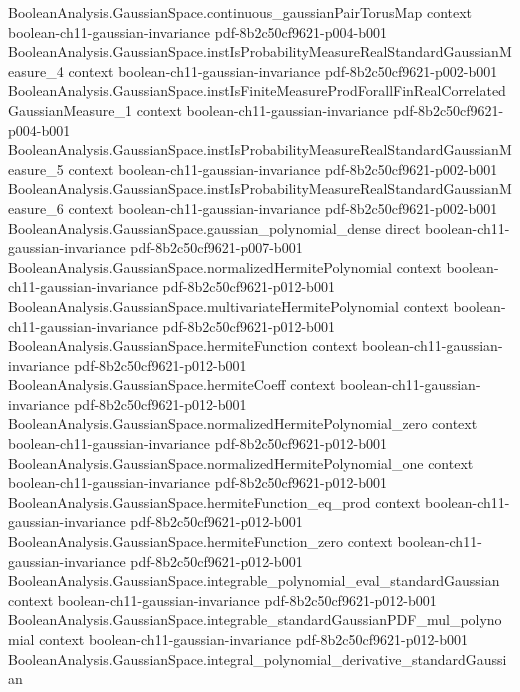 \begin{lemma}
  {BooleanAnalysis.GaussianSpace.continuous_gaussianPairTorusMap}
  {context}
  {boolean-ch11-gaussian-invariance}
  {pdf-8b2c50cf9621-p004-b001}
\proofstep
  {BooleanAnalysis.GaussianSpace.instIsProbabilityMeasureRealStandardGaussianMeasure_4}
  {context}
  {boolean-ch11-gaussian-invariance}
  {pdf-8b2c50cf9621-p002-b001}
\proofstep
  {BooleanAnalysis.GaussianSpace.instIsFiniteMeasureProdForallFinRealCorrelatedGaussianMeasure_1}
  {context}
  {boolean-ch11-gaussian-invariance}
  {pdf-8b2c50cf9621-p004-b001}
\proofstep
  {BooleanAnalysis.GaussianSpace.instIsProbabilityMeasureRealStandardGaussianMeasure_5}
  {context}
  {boolean-ch11-gaussian-invariance}
  {pdf-8b2c50cf9621-p002-b001}
\proofstep
  {BooleanAnalysis.GaussianSpace.instIsProbabilityMeasureRealStandardGaussianMeasure_6}
  {context}
  {boolean-ch11-gaussian-invariance}
  {pdf-8b2c50cf9621-p002-b001}
\proofstep
  {BooleanAnalysis.GaussianSpace.gaussian_polynomial_dense}
  {direct}
  {boolean-ch11-gaussian-invariance}
  {pdf-8b2c50cf9621-p007-b001}
\proofstep
  {BooleanAnalysis.GaussianSpace.normalizedHermitePolynomial}
  {context}
  {boolean-ch11-gaussian-invariance}
  {pdf-8b2c50cf9621-p012-b001}
\proofstep
  {BooleanAnalysis.GaussianSpace.multivariateHermitePolynomial}
  {context}
  {boolean-ch11-gaussian-invariance}
  {pdf-8b2c50cf9621-p012-b001}
\proofstep
  {BooleanAnalysis.GaussianSpace.hermiteFunction}
  {context}
  {boolean-ch11-gaussian-invariance}
  {pdf-8b2c50cf9621-p012-b001}
\proofstep
  {BooleanAnalysis.GaussianSpace.hermiteCoeff}
  {context}
  {boolean-ch11-gaussian-invariance}
  {pdf-8b2c50cf9621-p012-b001}
\proofstep
  {BooleanAnalysis.GaussianSpace.normalizedHermitePolynomial_zero}
  {context}
  {boolean-ch11-gaussian-invariance}
  {pdf-8b2c50cf9621-p012-b001}
\proofstep
  {BooleanAnalysis.GaussianSpace.normalizedHermitePolynomial_one}
  {context}
  {boolean-ch11-gaussian-invariance}
  {pdf-8b2c50cf9621-p012-b001}
\proofstep
  {BooleanAnalysis.GaussianSpace.hermiteFunction_eq_prod}
  {context}
  {boolean-ch11-gaussian-invariance}
  {pdf-8b2c50cf9621-p012-b001}
\proofstep
  {BooleanAnalysis.GaussianSpace.hermiteFunction_zero}
  {context}
  {boolean-ch11-gaussian-invariance}
  {pdf-8b2c50cf9621-p012-b001}
\proofstep
  {BooleanAnalysis.GaussianSpace.integrable_polynomial_eval_standardGaussian}
  {context}
  {boolean-ch11-gaussian-invariance}
  {pdf-8b2c50cf9621-p012-b001}
\proofstep
  {BooleanAnalysis.GaussianSpace.integrable_standardGaussianPDF_mul_polynomial}
  {context}
  {boolean-ch11-gaussian-invariance}
  {pdf-8b2c50cf9621-p012-b001}
\proofstep
  {BooleanAnalysis.GaussianSpace.integral_polynomial_derivative_standardGaussian}

\end{lemma}
